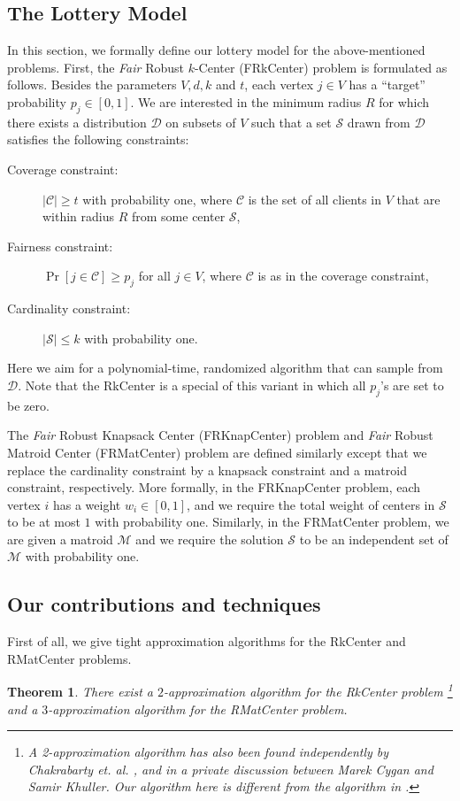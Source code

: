\documentclass[a4paper,11pt]{article}
\newtheorem{theorem}{Theorem}[section]
\newcommand{\C}{\mathcal{C}}
\newcommand{\D}{\mathcal{D}}
\renewcommand{\S}{\mathcal{S}}
\newcommand{\M}{\mathcal{M}}
\begin{document}
\subsection{The Lottery Model}
In this section, we formally define our lottery model for the above-mentioned problems. First, the \emph{Fair} Robust $k$-Center (\textsf{FRkCenter}) problem is formulated as follows. Besides the parameters $V,d,k$ and $t$, each vertex $j \in V$ has a ``target'' probability $p_j \in [0,1]$. We are interested in the minimum radius $R$ for which there exists a distribution $\D$ on subsets of $V$ such that a set $\S$ drawn from $\D$ satisfies the following constraints:
\begin{description}
	\item[Coverage constraint:] $|\C| \geq t$ with probability one, where $\C$ is the set of all clients in $V$ that are within radius $R$ from some center $\S$,
	\item[Fairness constraint:] $\Pr[j \in \C] \geq p_j$ for all $j \in V$, where $\mathcal{C}$ is as in the coverage constraint,
	\item[Cardinality constraint:] $|\S| \leq k$ with probability one.
\end{description}
Here we aim for a polynomial-time, randomized algorithm that can sample from $\D$. Note that the \textsf{RkCenter} is a special of this variant in which all $p_j$'s are set to be zero.


The \emph{Fair} Robust Knapsack Center (\textsf{FRKnapCenter}) problem and \emph{Fair} Robust Matroid Center (\textsf{FRMatCenter}) problem are defined similarly except that we replace the cardinality constraint by a knapsack constraint and a matroid constraint, respectively. More formally, in the \textsf{FRKnapCenter} problem, each vertex $i$ has a weight $w_i \in [0,1]$, and we require the total weight of centers in $\S$ to be at most $1$ with probability one. Similarly, in the \textsf{FRMatCenter} problem, we are given a matroid $\M$ and we require the solution $\S$ to be an independent set of $\M$ with probability one.


\subsection{Our contributions and techniques}
First of all, we give tight approximation algorithms for the \textsf{RkCenter} and \textsf{RMatCenter} problems.

\begin{theorem}
There exist a $2$-approximation algorithm for the \textsf{RkCenter} problem \footnote{A 2-approximation algorithm has also been found independently by Chakrabarty et. al. \cite{chakrabarty_et_al}, and in a private discussion between Marek Cygan and Samir Khuller. Our algorithm here is different from the algorithm in \cite{chakrabarty_et_al}.} and a $3$-approximation algorithm for the \textsf{RMatCenter} problem. 
\label{theorem:standard_models}
\end{theorem}
\end{document}
